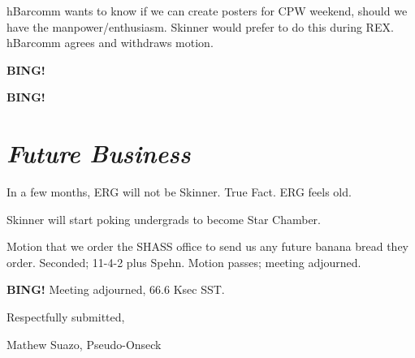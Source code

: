 \documentclass[10pt]{article}
\newcommand{\bing}{{\bf BING!} }
\newcommand{\goto}[1]{\bing \vskip 12pt \section*{{\em{#1}}}}
\newcommand{\ps}{ plus Spehn\xspace}
\newcommand{\onseck}{Mathew Suazo, Pseudo-Onseck}
\begin{document}
hBarcomm wants to know if we can create posters for CPW weekend, should we have the manpower/enthusiasm. Skinner would prefer to do this during REX. hBarcomm agrees and withdraws motion.

\bing

\goto{Future Business}

In a few months, ERG will not be Skinner. True Fact. ERG feels old.

Skinner will start poking undergrads to become Star Chamber.

Motion that we order the SHASS office to send us any future banana bread they order. Seconded; 11-4-2 \ps. Motion passes; meeting adjourned.

\bing
\noindent
Meeting adjourned, 66.6 Ksec SST.

\vspace{18pt}

\centerline{Respectfully submitted,}
\centerline{\onseck}
\end{document}
